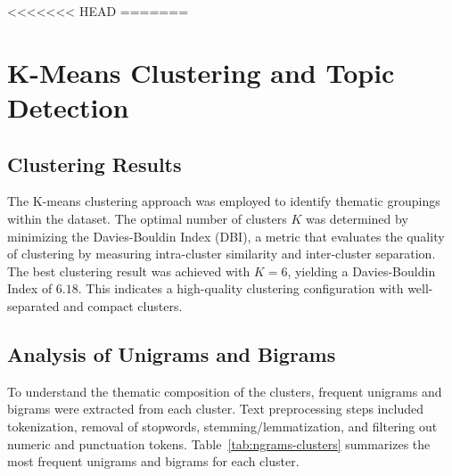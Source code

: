 <<<<<<< HEAD
=======
\section{K-Means Clustering and Topic Detection}

\subsection{Clustering Results}
The K-means clustering approach was employed to identify thematic groupings within the dataset. The optimal number of clusters $K$ was determined by minimizing the Davies-Bouldin Index (DBI), a metric that evaluates the quality of clustering by measuring intra-cluster similarity and inter-cluster separation. The best clustering result was achieved with $K = 6$, yielding a Davies-Bouldin Index of $6.18$. This indicates a high-quality clustering configuration with well-separated and compact clusters.

\subsection{Analysis of Unigrams and Bigrams}
To understand the thematic composition of the clusters, frequent unigrams and bigrams were extracted from each cluster. Text preprocessing steps included tokenization, removal of stopwords, stemming/lemmatization, and filtering out numeric and punctuation tokens. Table~\ref{tab:ngrams-clusters} summarizes the most frequent unigrams and bigrams for each cluster.

